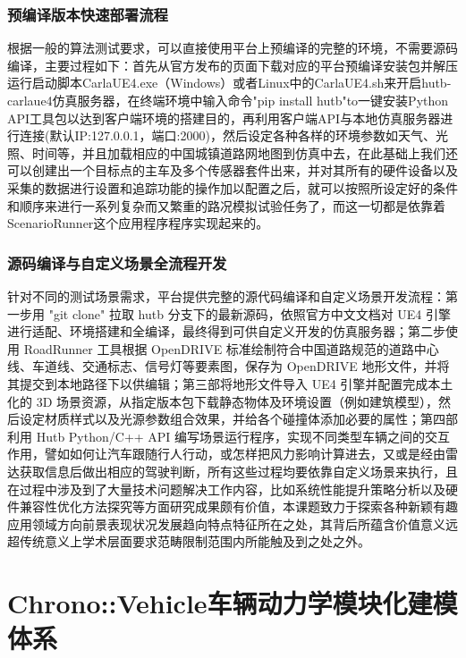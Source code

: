 \subsubsection{预编译版本快速部署流程}

根据一般的算法测试要求，可以直接使用平台上预编译的完整的环境，不需要源码编译，主要过程如下：首先从官方发布的页面下载对应的平台预编译安装包并解压运行启动脚本CarlaUE4.exe（Windows）或者Linux中的CarlaUE4.sh来开启hutb-carlaue4仿真服务器，在终端环境中输入命令"pip install hutb"to一键安装Python API工具包以达到客户端环境的搭建目的，再利用客户端API与本地仿真服务器进行连接(默认IP:127.0.0.1，端口:2000)，然后设定各种各样的环境参数如天气、光照、时间等，并且加载相应的中国城镇道路网地图到仿真中去，在此基础上我们还可以创建出一个目标点的主车及多个传感器套件出来，并对其所有的硬件设备以及采集的数据进行设置和追踪功能的操作加以配置之后，就可以按照所设定好的条件和顺序来进行一系列复杂而又繁重的路况模拟试验任务了，而这一切都是依靠着ScenarioRunner这个应用程序程序实现起来的。

\subsubsection{源码编译与自定义场景全流程开发}

针对不同的测试场景需求，平台提供完整的源代码编译和自定义场景开发流程：第一步用 "git clone" 拉取 hutb 分支下的最新源码，依照官方中文文档对 UE4 引擎进行适配、环境搭建和全编译，最终得到可供自定义开发的仿真服务器；第二步使用 RoadRunner 工具根据 OpenDRIVE 标准绘制符合中国道路规范的道路中心线、车道线、交通标志、信号灯等要素图，保存为 OpenDRIVE 地形文件，并将其提交到本地路径下以供编辑；第三部将地形文件导入 UE4 引擎并配置完成本土化的 3D 场景资源，从指定版本包下载静态物体及环境设置（例如建筑模型），然后设定材质样式以及光源参数组合效果，并给各个碰撞体添加必要的属性；第四部利用 Hutb Python/C++ API 编写场景运行程序，实现不同类型车辆之间的交互作用，譬如如何让汽车跟随行人行动，或怎样把风力影响计算进去，又或是经由雷达获取信息后做出相应的驾驶判断，所有这些过程均要依靠自定义场景来执行，且在过程中涉及到了大量技术问题解决工作内容，比如系统性能提升策略分析以及硬件兼容性优化方法探究等方面研究成果颇有价值，本课题致力于探索各种新颖有趣应用领域方向前景表现状况发展趋向特点特征所在之处，其背后所蕴含价值意义远超传统意义上学术层面要求范畴限制范围内所能触及到之处之外。

\section{Chrono::Vehicle车辆动力学模块化建模体系}

